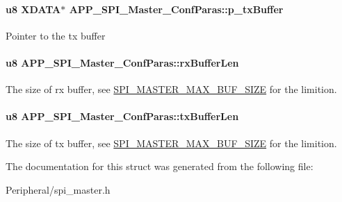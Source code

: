 \paragraph[{\texorpdfstring{p\+\_\+tx\+Buffer}{p_txBuffer}}]{\setlength{\rightskip}{0pt plus 5cm}u8 X\+D\+A\+TA$\ast$ A\+P\+P\+\_\+\+S\+P\+I\+\_\+\+Master\+\_\+\+Conf\+Paras\+::p\+\_\+tx\+Buffer}\hypertarget{struct_a_p_p___s_p_i___master___conf_paras_a0a4aadeca7214fca5e4bac58db4e8918}{}\label{struct_a_p_p___s_p_i___master___conf_paras_a0a4aadeca7214fca5e4bac58db4e8918}
Pointer to the tx buffer 
\paragraph[{\texorpdfstring{rx\+Buffer\+Len}{rxBufferLen}}]{\setlength{\rightskip}{0pt plus 5cm}u8 A\+P\+P\+\_\+\+S\+P\+I\+\_\+\+Master\+\_\+\+Conf\+Paras\+::rx\+Buffer\+Len}\hypertarget{struct_a_p_p___s_p_i___master___conf_paras_a81b4eda9480a6dafa35b107cd46910d3}{}\label{struct_a_p_p___s_p_i___master___conf_paras_a81b4eda9480a6dafa35b107cd46910d3}
The size of rx buffer, see \hyperlink{group___s_p_i___m_a_s_t_e_r___m_a_x___b_u_f___s_i_z_e}{S\+P\+I\+\_\+\+M\+A\+S\+T\+E\+R\+\_\+\+M\+A\+X\+\_\+\+B\+U\+F\+\_\+\+S\+I\+ZE} for the limition. 
\paragraph[{\texorpdfstring{tx\+Buffer\+Len}{txBufferLen}}]{\setlength{\rightskip}{0pt plus 5cm}u8 A\+P\+P\+\_\+\+S\+P\+I\+\_\+\+Master\+\_\+\+Conf\+Paras\+::tx\+Buffer\+Len}\hypertarget{struct_a_p_p___s_p_i___master___conf_paras_ae5c426e92642336228c5d5dfebaf81c5}{}\label{struct_a_p_p___s_p_i___master___conf_paras_ae5c426e92642336228c5d5dfebaf81c5}
The size of tx buffer, see \hyperlink{group___s_p_i___m_a_s_t_e_r___m_a_x___b_u_f___s_i_z_e}{S\+P\+I\+\_\+\+M\+A\+S\+T\+E\+R\+\_\+\+M\+A\+X\+\_\+\+B\+U\+F\+\_\+\+S\+I\+ZE} for the limition. 

The documentation for this struct was generated from the following file\+:\begin{DoxyCompactItemize}
\item 
Peripheral/spi\+\_\+master.\+h\end{DoxyCompactItemize}

